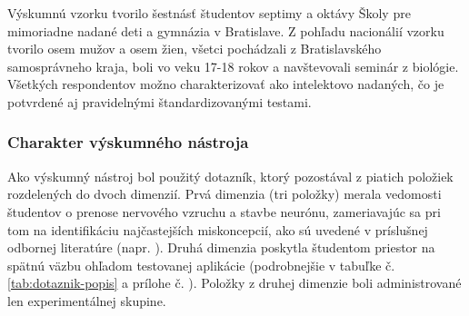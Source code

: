 Výskumnú vzorku tvorilo šestnásť študentov septimy a oktávy Školy pre mimoriadne nadané deti a gymnázia v Bratislave. Z pohľadu nacionálií vzorku tvorilo osem mužov a osem žien, všetci pochádzali z Bratislavského samosprávneho 
kraja, boli vo veku 17-18 rokov a navštevovali seminár z biológie. Všetkých respondentov možno charakterizovať ako intelektovo nadaných, čo je potvrdené aj pravidelnými štandardizovanými testami.

\subsubsection{Charakter výskumného nástroja}
Ako výskumný nástroj bol použitý dotazník, ktorý pozostával z piatich položiek rozdelených do dvoch dimenzií. Prvá dimenzia (tri položky) merala vedomosti študentov o prenose nervového vzruchu a stavbe neurónu, zameriavajúc sa 
pri tom na identifikáciu najčastejších miskoncepcií, ako sú uvedené v príslušnej odbornej literatúre (napr. \cite{vijapurkarWhatCellsReally2014, odomActionPotentialsBiology1993, nagyovaMiskoncepcieZiakovOblasti2016}).  
Druhá dimenzia poskytla študentom priestor na spätnú väzbu ohľadom testovanej aplikácie (podrobnejšie v tabuľke č. \ref{tab:dotaznik-popis} a prílohe č. ). Položky z druhej dimenzie boli administrované len 
experimentálnej skupine.

